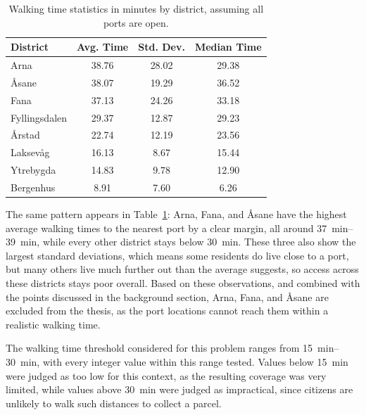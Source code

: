 \documentclass[12pt]{article}
\begin{document}
\begin{table}[htbp]
  \centering
  \caption{Walking time statistics in minutes by district, assuming all ports are open.}
  \label{tab:walking_times}

  \begin{tabular}{l c c c}
    \toprule
    \textbf{District} & \textbf{Avg. Time} & \textbf{Std. Dev.} & \textbf{Median Time} \\
    \midrule
    Arna              & 38.76              & 28.02              & 29.38                \\
    Åsane             & 38.07              & 19.29              & 36.52                \\
    Fana              & 37.13              & 24.26              & 33.18                \\
    Fyllingsdalen     & 29.37              & 12.87              & 29.23                \\
    Årstad            & 22.74              & 12.19              & 23.56                \\
    Laksevåg          & 16.13              & 8.67               & 15.44                \\
    Ytrebygda         & 14.83              & 9.78               & 12.90                \\
    Bergenhus         & 8.91               & 7.60               & 6.26                 \\
    \bottomrule
  \end{tabular}
\end{table}

The same pattern appears in Table~\ref{tab:walking_times}: Arna, Fana, and Åsane have the highest average walking times to the nearest port by a clear margin, all around \qtyrange{37}{39}{\minute}, while every other district stays below \qty{30}{\minute}. These three also show the largest standard deviations, which means some residents do live close to a port, but many others live much further out than the average suggests, so access across these districts stays poor overall. Based on these observations, and combined with the points discussed in the background section, Arna, Fana, and Åsane are excluded from the thesis, as the port locations cannot reach them within a realistic walking time.

The walking time threshold considered for this problem ranges from \qtyrange{15}{30}{\minute}, with every integer value within this range tested. Values below \qty{15}{\minute} were judged as too low for this context, as the resulting coverage was very limited, while values above \qty{30}{\minute} were judged as impractical, since citizens are unlikely to walk such distances to collect a parcel.
\end{document}
